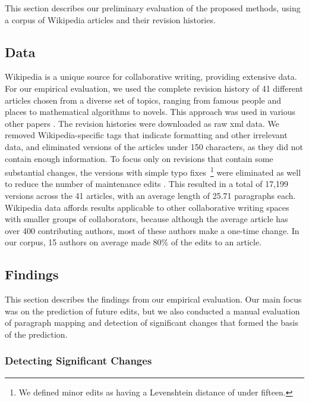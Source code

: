 This section describes our preliminary evaluation of the proposed
methods, using a corpus of Wikipedia articles and their revision
histories.

\subsection{Data}\label{data}

Wikipedia is a unique source for collaborative writing, providing
extensive data. For our empirical evaluation, we used the complete
revision history of 41 different articles chosen from a diverse set of
topics, ranging from famous people and places to mathematical algorithms
to novels. This approach was used in various other papers
\cite{wohner2009assessing, fong2010did}. The revision histories were
downloaded as raw xml data. We removed Wikipedia-specific tags that
indicate formatting and other irrelevant data, and eliminated versions
of the articles under 150 characters, as they did not contain enough
information. To focus only on revisions that contain some substantial
changes, the versions with simple typo fixes~\footnote{We defined minor
  edits as having a Levenshtein distance of under fifteen.} were
eliminated as well to reduce the number of maintenance edits
\cite{kittur2007he}. This resulted in a total of 17,199 versions across
the 41 articles, with an average length of 25.71 paragraphs each.
Wikipedia data affords results applicable to other collaborative writing
spaces with smaller groups of collaborators, because although the
average article has over 400 contributing authors, most of these authors
make a one-time change. In our corpus, 15 authors on average made 80\%
of the edits to an article.

\subsection{Findings}\label{findings}

This section describes the findings from our empirical evaluation. Our
main focus was on the prediction of future edits, but we also conducted
a manual evaluation of paragraph mapping and detection of significant
changes that formed the basis of the prediction.

\subsubsection{Detecting Significant
Changes}\label{detecting-significant-changes}

